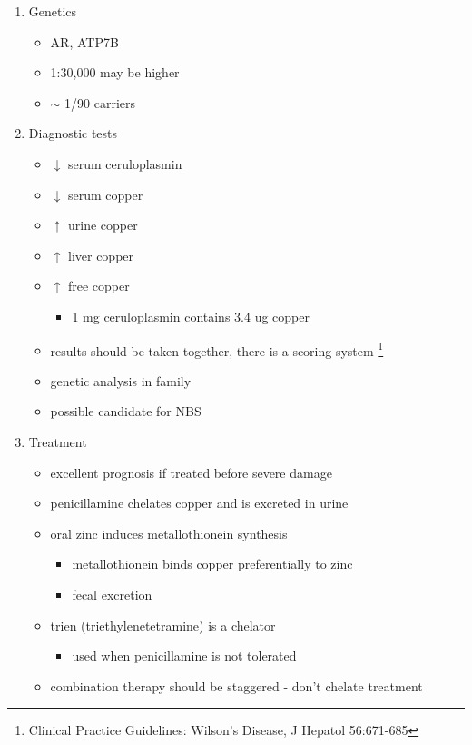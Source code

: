 \documentclass{scrartcl}
\begin{document}
\begin{enumerate}
\item Genetics
\label{sec:orgb6a915c}
\begin{itemize}
\item AR, ATP7B
\item 1:30,000 may be higher
\item \(\sim\) 1/90 carriers
\end{itemize}

\item Diagnostic tests
\label{sec:org189c602}
\begin{itemize}
\item \(\downarrow\) serum ceruloplasmin
\item \(\downarrow\) serum copper
\item \(\uparrow\) urine copper
\item \(\uparrow\) liver copper
\item \(\uparrow\) free copper
\begin{itemize}
\item 1 mg ceruloplasmin contains 3.4 ug copper
\end{itemize}
\item results should be taken together, there is a scoring system \footnote{Clinical Practice Guidelines: Wilson's Disease, J Hepatol 56:671-685}
\item genetic analysis in family
\item possible candidate for NBS
\end{itemize}

\item Treatment
\label{sec:org88b4a54}
\begin{itemize}
\item excellent prognosis if treated before severe damage
\item penicillamine chelates copper and is excreted in urine
\item oral zinc induces metallothionein synthesis
\begin{itemize}
\item metallothionein binds copper preferentially to zinc
\item fecal excretion
\end{itemize}
\item trien (triethylenetetramine) is a chelator
\begin{itemize}
\item used when penicillamine is not tolerated
\end{itemize}
\item combination therapy should be staggered - don't chelate treatment
\end{itemize}
\end{enumerate}
\end{document}
